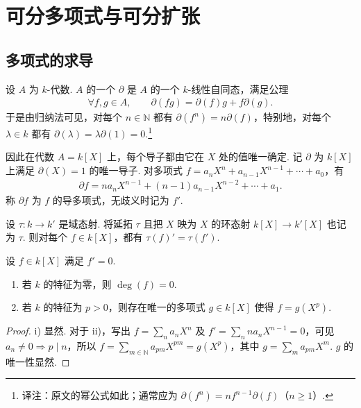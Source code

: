 \section{可分多项式与可分扩张}\label{sec:galois-2-5}
\subsection{多项式的求导}\label{sec:galois-2-5-1}
设 $A$ 为 $k$-代数. $A$ 的一个 $\partial$ 是 $A$ 的一个 $k$-线性自同态，满足公理
\begin{align*}
\forall f,g\in A,\qquad \partial(fg)=\partial(f)g+f\partial(g).
\end{align*}
于是由归纳法可见，对每个 $n\in\mathbb N$ 都有 $\partial(f^n)=n\partial(f)$，特别地，对每个 $\lambda\in k$ 都有 $\partial(\lambda)=\lambda\partial(1)=0$.\footnote{译注：原文的幂公式如此；通常应为 $\partial(f^n)=nf^{n-1}\partial(f)$（$n\geq1$）.}

因此在代数 $A=k[X]$ 上，每个导子都由它在 $X$ 处的值唯一确定. 记 $\partial$ 为 $k[X]$ 上满足 $\partial(X)=1$ 的唯一导子. 对多项式 $f=a_nX^n+a_{n-1}X^{n-1}+\cdots+a_0$，有
\begin{align*}
\partial f=na_nX^{n-1}+(n-1)a_{n-1}X^{n-2}+\cdots+a_1.
\end{align*}
称 $\partial f$ 为 $f$ 的导多项式，无歧义时记为 $f'$.
\begin{remark*}
设 $\tau:k\to k'$ 是域态射. 将延拓 $\tau$ 且把 $X$ 映为 $X$ 的环态射 $k[X]\longrightarrow k'[X]$ 也记为 $\tau$. 则对每个 $f\in k[X]$，都有 $\tau(f)'=\tau(f')$.
\end{remark*}
\begin{lemma*}
设 $f\in k[X]$ 满足 $f'=0$.
\begin{enumerate}[label=\roman*)]
\item 若 $k$ 的特征为零，则 $\deg(f)=0$.
\item 若 $k$ 的特征为 $p>0$，则存在唯一的多项式 $g\in k[X]$ 使得 $f=g(X^p)$.
\end{enumerate}
\end{lemma*}
\begin{proof}
i) 显然. 对于 ii)，写出 $f=\sum_na_nX^n$ 及 $f'=\sum_nna_nX^{n-1}=0$，可见 $a_n\ne0\Rightarrow p\mid n$，所以 $f=\sum_{m\in\mathbb N}a_{pm}X^{pm}=g(X^p)$，其中 $g=\sum_ma_{pm}X^m$. $g$ 的唯一性显然.
\end{proof}
